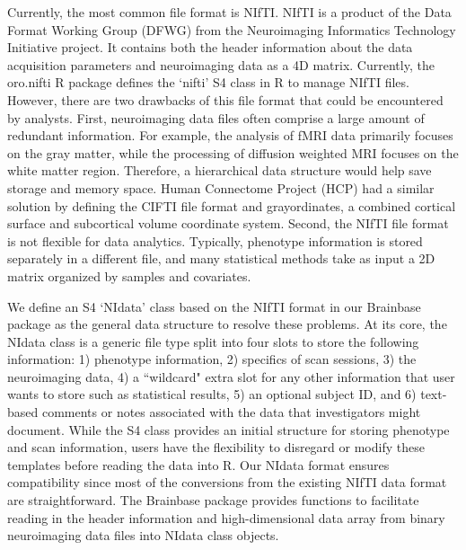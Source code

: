 \documentclass{nature}
\begin{document}
Currently, the most common file format is NIfTI.
NIfTI is a product of the Data Format Working Group
(DFWG) from the Neuroimaging Informatics Technology Initiative project. It
contains both the header information about the data acquisition
parameters and neuroimaging data as a 4D matrix.
Currently, the oro.nifti R package defines the `nifti'
S4 class in R to manage NIfTI files. However, there are two drawbacks
of this file format that could be encountered by analysts. First, neuroimaging
data files often comprise a large amount of
redundant information.
For example,
the analysis of fMRI data primarily focuses on the gray matter, while the
processing of diffusion weighted MRI focuses on the white matter region.
Therefore, a hierarchical data structure would help save storage and memory
space. Human Connectome Project (HCP) had a similar solution by defining the
CIFTI
file format and grayordinates, a combined cortical surface and subcortical
volume coordinate system\cite{Glasser2013The}.
Second, the NIfTI file format is not flexible for data analytics. Typically,
phenotype information is stored separately in a different file, and many
statistical
methods take as input a 2D matrix organized by samples and covariates.

We define an S4 `NIdata' class based on the NIfTI format
in our Brainbase package as
the general data structure to resolve these problems.
At its core, the NIdata class is a generic file type split into
four slots to store the following information: 1) phenotype
information, 2) specifics of scan sessions, 3) the neuroimaging data,
4) a ``wildcard" extra slot for any other information that user
wants to store such as statistical results, 5) an optional subject ID,
and 6) text-based comments or notes associated with the data that
investigators might document. While the
S4 class provides an initial structure for storing
phenotype and scan information, users have the flexibility to disregard or
modify these templates before reading the data into R.
Our NIdata format ensures compatibility since most of the conversions from
the existing NIfTI data format are
straightforward. The Brainbase package provides functions
to facilitate
reading in the header information and high-dimensional data array from binary
neuroimaging data files into NIdata class objects.
\end{document}

